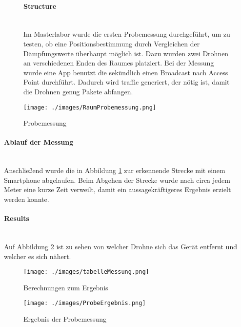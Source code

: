 \documentclass[a4paper]{spie}  %
\begin{document}
\begin{figure}[H]
\begin{minipage}[t]{0.4\textwidth}
\vspace{0pt}
\paragraph{Structure}\mbox{}\\
Im Masterlabor wurde die ersten Probemessung durchgeführt, um zu testen, ob eine Positionsbestimmung durch Vergleichen der Dämpfungswerte überhaupt möglich ist. Dazu wurden zwei Drohnen an verschiedenen Enden des Raumes platziert. Bei der Messung wurde eine App benutzt die sekündlich einen Broadcast nach Access Point durchführt. Dadurch wird traffic generiert, der nötig ist, damit die Drohnen genug Pakete abfangen.
\end{minipage}
\hfill
\begin{minipage}[t]{0.5\textwidth}
\vspace{0pt}
\centering
		\texttt{[image: ./images/RaumProbemessung.png]}
		\caption{Probemessung}
		\label{fig:probeMessung}
\end{minipage}
\end{figure}

\paragraph{Ablauf der Messung}\mbox{}\\
Anschließend wurde die in Abbildung \ref{fig:probeMessung} zur erkennende Strecke mit einem Smartphone abgelaufen. Beim Abgehen der Strecke wurde nach circa jedem Meter eine kurze Zeit verweilt, damit ein aussagekräftigeres Ergebnis erzielt werden konnte.

\paragraph{Results}\mbox{}\\
Auf Abbildung \ref{fig:test1} ist zu sehen von welcher Drohne sich das Gerät entfernt und welcher es sich nähert.\\

\begin{figure}[H]
\begin{minipage}[t]{0.4\textwidth}
\vspace{0pt}
\texttt{[image: ./images/tabelleMessung.png]}
\caption{Berechnungen zum Ergebnis}
\label{fig:tablleMessung}
\end{minipage}
\hfill
\begin{minipage}[t]{0.5\textwidth}
\vspace{0pt}
		\texttt{[image: ./images/ProbeErgebnis.png]}
		\caption{Ergebnis der Probemessung}
		\label{fig:test1}
\end{minipage}
\end{figure}
\end{document}
